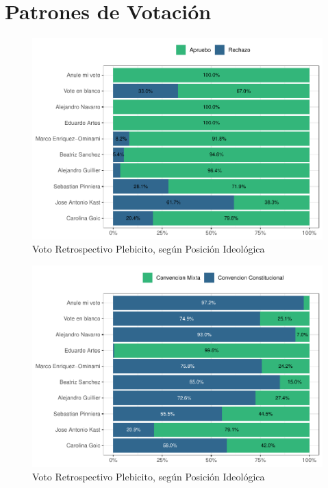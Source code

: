 \documentclass[
  12pt,
  openany]{book}
\begin{document}
\hypertarget{patrones-de-votaciuxf3n}{%
\section{Patrones de Votación}\label{patrones-de-votaciuxf3n}}

\begin{figure}

{\centering \includegraphics{reporte-elsoc_files/figure-latex/presi-voto-c44-1} 

}

\caption{Voto Retrospectivo Plebicito, según Posición Ideológica}\label{fig:presi-voto-c44}
\end{figure}

\begin{figure}

{\centering \includegraphics{reporte-elsoc_files/figure-latex/presi-voto-c45-1} 

}

\caption{Voto Retrospectivo Plebicito, según Posición Ideológica}\label{fig:presi-voto-c45}
\end{figure}
\end{document}
